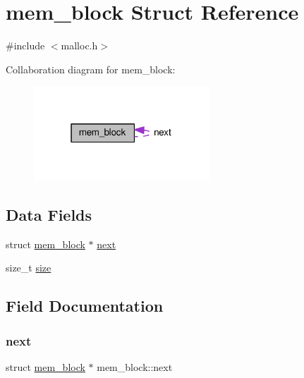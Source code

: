 \hypertarget{structmem__block}{}\section{mem\+\_\+block Struct Reference}
\label{structmem__block}


{\ttfamily \#include $<$malloc.\+h$>$}



Collaboration diagram for mem\+\_\+block\+:\nopagebreak
\begin{figure}[H]
\begin{center}
\leavevmode
\includegraphics[width=187pt]{structmem__block__coll__graph}
\end{center}
\end{figure}
\subsection*{Data Fields}
\begin{DoxyCompactItemize}
\item 
struct \hyperlink{structmem__block}{mem\+\_\+block} $\ast$ \hyperlink{structmem__block_ac3317f1b6603856e265b1ba15c4a99b8}{next}
\item 
size\+\_\+t \hyperlink{structmem__block_a5ff4ee5dcd970bbc4951eb108c5eec4b}{size}
\end{DoxyCompactItemize}


\subsection{Field Documentation}
\mbox{\label{structmem__block_ac3317f1b6603856e265b1ba15c4a99b8}} 
\subsubsection{\texorpdfstring{next}{next}}
{\footnotesize\ttfamily struct \hyperlink{structmem__block}{mem\+\_\+block} $\ast$ mem\+\_\+block\+::next}

